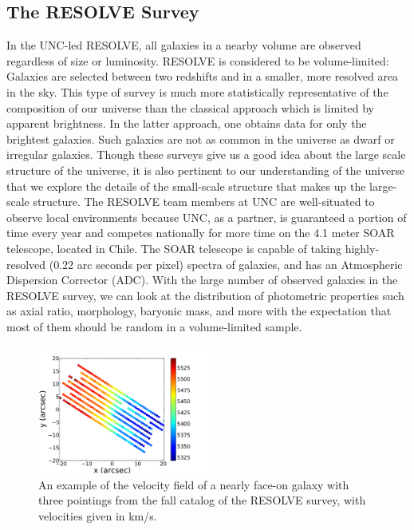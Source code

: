 \documentclass{emulateapj}
\begin{document}
\subsection{The RESOLVE Survey}
\large In the UNC-led RESOLVE, all galaxies in a nearby volume are observed regardless of size or luminosity. RESOLVE is considered to be volume-limited: Galaxies are selected between two redshifts and in a smaller, more resolved area in the sky. This type of survey is much more statistically representative of the composition of our universe than the classical approach which is limited by apparent brightness. In the latter approach, one obtains data for only the brightest galaxies. Such galaxies are not as common in the universe as dwarf or irregular galaxies. Though these surveys give us a good idea about the large scale structure of the universe, it is also pertinent to our understanding of the universe that we explore the details of the small-scale structure that makes up the large-scale structure. The RESOLVE team members at UNC are well-situated to observe local environments because UNC, as a partner, is guaranteed a portion of time every year and competes nationally for more time on the 4.1 meter SOAR telescope, located in Chile. The SOAR telescope is capable of taking highly-resolved (0.22 arc seconds per pixel) spectra of galaxies, and has an Atmospheric Dispersion Corrector (ADC). With the large number of observed galaxies in the RESOLVE survey, we can look at the distribution of photometric properties such as axial ratio, morphology, baryonic mass, and more with the expectation that most of them should be random in a volume-limited sample.

\begin{figure}
\includegraphics[width=0.5\textwidth]{rf0071example.pdf}
\caption{An example of the velocity field of a nearly face-on galaxy with three pointings from the fall catalog of the RESOLVE survey, with velocities given in km/s. \label{fig:test}}
\end{figure}
\end{document}
